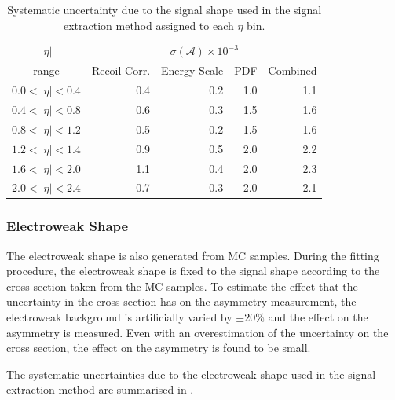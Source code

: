 \begin{table}[htbp]
\begin{center}
\begin{tabular}{crrrr}
    \toprule
$|\eta|$   & \multicolumn{4}{c}{$\sigma(\mathcal{A}) \times 10^{-3}$}\\
range      & Recoil Corr. & Energy Scale & PDF & Combined \\
\midrule
$0.0<|\eta|<0.4$ &  0.4 & 0.2 & 1.0  & 1.1 \\
$0.4<|\eta|<0.8$ &  0.6 & 0.3 & 1.5  & 1.6 \\
$0.8<|\eta|<1.2$ &  0.5 & 0.2 & 1.5  & 1.6 \\
$1.2<|\eta|<1.4$ &  0.9 & 0.5 & 2.0  & 2.2 \\
$1.6<|\eta|<2.0$ &  1.1 & 0.4 & 2.0  & 2.3 \\
$2.0<|\eta|<2.4$ &  0.7 & 0.3 & 2.0  & 2.1 \\
    \bottomrule
\end{tabular}
\caption[Systematic uncertainty due to the signal \ETm shape used in the signal
extraction method.] {\label{tab:systSIG}Systematic uncertainty due to the signal
\ETm shape used in the signal extraction method assigned to each $\eta$
bin\cite{baisini2010electron}.}
\end{center}
\end{table}

\subsubsection{{Electroweak} \ETm Shape}

The {electroweak} shape is also generated from {MC} samples. During the fitting
procedure, the {electroweak} shape is fixed to the \Wenu signal shape according to
the cross section taken from the {MC} samples. To estimate the effect that the
uncertainty in the cross section has on the asymmetry measurement, the {electroweak}
background is artificially varied by $\pm20\%$ and the effect on the
asymmetry is measured. Even with an overestimation of the uncertainty on the
cross section, the effect on the asymmetry is found to be small.

The systematic uncertainties due to the electroweak \ETm shape used in the signal
extraction method are summarised in .

